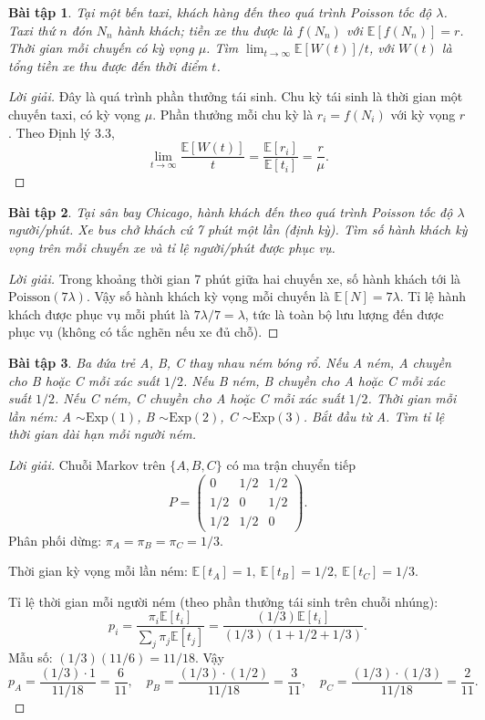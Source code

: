 \documentclass[8pt,a4paper]{article}
\newtheorem{exercise}{Bài tập}
\newenvironment{solution}{\begin{proof}[Lời giải]}{\end{proof}}
\newcommand{\E}{\mathbb{E}}
\begin{document}
\begin{exercise}
Tại một bến taxi, khách hàng đến theo quá trình Poisson tốc độ $\lambda$. Taxi thứ $n$ đón $N_n$ hành khách; tiền xe thu được là $f(N_n)$ với $\E[f(N_n)] = r$. Thời gian mỗi chuyến có kỳ vọng $\mu$. Tìm $\lim_{t\to\infty} \E[W(t)]/t$, với $W(t)$ là tổng tiền xe thu được đến thời điểm $t$.
\end{exercise}
\begin{solution}
Đây là quá trình phần thưởng tái sinh. Chu kỳ tái sinh là thời gian một chuyến taxi, có kỳ vọng $\mu$. Phần thưởng mỗi chu kỳ là $r_i = f(N_i)$ với kỳ vọng $r$. Theo Định lý 3.3,
\[
  \lim_{t\to\infty} \frac{\E[W(t)]}{t} = \frac{\E[r_i]}{\E[t_i]} = \frac{r}{\mu}.
\]
\end{solution}

\begin{exercise}
Tại sân bay Chicago, hành khách đến theo quá trình Poisson tốc độ $\lambda$ người/phút. Xe bus chở khách cứ 7 phút một lần (định kỳ). Tìm số hành khách kỳ vọng trên mỗi chuyến xe và tỉ lệ người/phút được phục vụ.
\end{exercise}
\begin{solution}
Trong khoảng thời gian 7 phút giữa hai chuyến xe, số hành khách tới là $\text{Poisson}(7\lambda)$. Vậy số hành khách kỳ vọng mỗi chuyến là $\E[N] = 7\lambda$. Tỉ lệ hành khách được phục vụ mỗi phút là $7\lambda/7 = \lambda$, tức là toàn bộ lưu lượng đến được phục vụ (không có tắc nghẽn nếu xe đủ chỗ).
\end{solution}

\begin{exercise}
Ba đứa trẻ A, B, C thay nhau ném bóng rổ. Nếu A ném, A chuyền cho B hoặc C mỗi xác suất $1/2$. Nếu B ném, B chuyền cho A hoặc C mỗi xác suất $1/2$. Nếu C ném, C chuyền cho A hoặc C mỗi xác suất $1/2$. Thời gian mỗi lần ném: A $\sim \text{Exp}(1)$, B $\sim \text{Exp}(2)$, C $\sim \text{Exp}(3)$. Bắt đầu từ A. Tìm tỉ lệ thời gian dài hạn mỗi người ném.
\end{exercise}
\begin{solution}
Chuỗi Markov trên $\{A, B, C\}$ có ma trận chuyển tiếp
\[
  P = \begin{pmatrix} 0 & 1/2 & 1/2 \\ 1/2 & 0 & 1/2 \\ 1/2 & 1/2 & 0 \end{pmatrix}.
\]
Phân phối dừng: $\pi_A = \pi_B = \pi_C = 1/3$.

Thời gian kỳ vọng mỗi lần ném: $\E[t_A]=1,\ \E[t_B]=1/2,\ \E[t_C]=1/3$.

Tỉ lệ thời gian mỗi người ném (theo phần thưởng tái sinh trên chuỗi nhúng):
\[
  p_i = \frac{\pi_i \E[t_i]}{\sum_j \pi_j \E[t_j]} = \frac{(1/3)\E[t_i]}{(1/3)(1 + 1/2 + 1/3)}.
\]
Mẫu số: $(1/3)(11/6) = 11/18$. Vậy
\[
  p_A = \frac{(1/3)\cdot 1}{11/18} = \frac{6}{11}, \quad p_B = \frac{(1/3)\cdot(1/2)}{11/18} = \frac{3}{11}, \quad p_C = \frac{(1/3)\cdot(1/3)}{11/18} = \frac{2}{11}.
\]
\end{solution}
\end{document}
